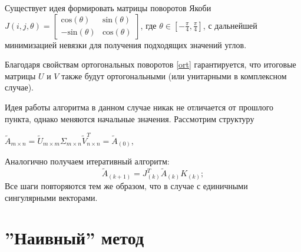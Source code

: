 \begin{note}
    Существует идея формировать матрицы поворотов Якоби $J(i,j,\theta) = \begin{bmatrix}
        \mathrm{cos}(\theta)&\mathrm{sin}(\theta)\\
        \mathrm{-sin}(\theta)&\mathrm{cos}(\theta)
    \end{bmatrix}$, где $\theta \in [-\frac{\pi}{4}, \frac{\pi}{4}]$, с дальнейшей минимизацией невязки для получения подходящих значений углов. 
\end{note}

\begin{note}
    Благодаря свойствам ортогональных поворотов \eqref{ort} гарантируется, что итоговые матрицы $U$ и $V$ также будут ортогональными (или унитарными в комплексном случае). 
\end{note}


Идея работы алгоритма в данном случае никак не отличается от прошлого пункта, однако меняются начальные значения. Рассмотрим структуру 
\begin{center}
    $\tilde{A}_{m \times n} = \tilde{U}_{m\times m}\Sigma_{m\times n}\tilde{V}^T_{n \times n} = \tilde{A}_{(0)}$,
\end{center}
Аналогично получаем итеративный алгоритм:
\begin{equation}
    \tilde{A}_{(k+1)}= J^T_{(k)}\tilde{A}_{(k)}K_{(k)};
\end{equation}
Все шаги повторяются тем же образом, что в случае с единичными сингулярными векторами.





\newpage
\section{''Наивный'' метод}

